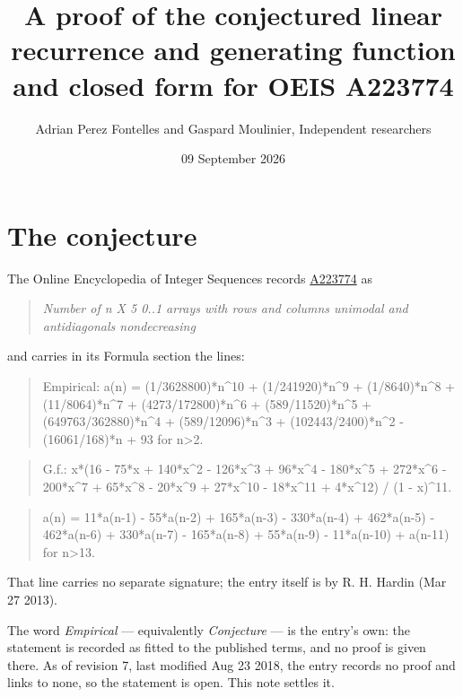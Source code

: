 \documentclass[11pt]{article}
\title{A proof of the conjectured linear recurrence and generating function and closed form for OEIS A223774}
\author{Adrian Perez Fontelles and Gaspard Moulinier, Independent researchers}
\date{09 September 2026}
\theoremstyle{definition}
\begin{document}
\maketitle
\section{The conjecture}

The Online Encyclopedia of Integer Sequences records \href{https://oeis.org/A223774}{A223774} as

\begin{quote}\itshape Number of n X 5 0..1 arrays with rows and columns unimodal and antidiagonals nondecreasing\end{quote}

and carries in its Formula section the lines:

\begin{quote}\ttfamily Empirical: a(n) = (1/3628800)*n\textasciicircum{}10 + (1/241920)*n\textasciicircum{}9 + (1/8640)*n\textasciicircum{}8 + (11/8064)*n\textasciicircum{}7 + (4273/172800)*n\textasciicircum{}6 + (589/11520)*n\textasciicircum{}5 + (649763/362880)*n\textasciicircum{}4 + (589/12096)*n\textasciicircum{}3 + (102443/2400)*n\textasciicircum{}2 - (16061/168)*n + 93 for n>2.\end{quote}

\begin{quote}\ttfamily G.f.: x*(16 - 75*x + 140*x\textasciicircum{}2 - 126*x\textasciicircum{}3 + 96*x\textasciicircum{}4 - 180*x\textasciicircum{}5 + 272*x\textasciicircum{}6 - 200*x\textasciicircum{}7 + 65*x\textasciicircum{}8 - 20*x\textasciicircum{}9 + 27*x\textasciicircum{}10 - 18*x\textasciicircum{}11 + 4*x\textasciicircum{}12) / (1 - x)\textasciicircum{}11.\end{quote}

\begin{quote}\ttfamily a(n) = 11*a(n-1) - 55*a(n-2) + 165*a(n-3) - 330*a(n-4) + 462*a(n-5) - 462*a(n-6) + 330*a(n-7) - 165*a(n-8) + 55*a(n-9) - 11*a(n-10) + a(n-11) for n>13.\end{quote}

That line carries no separate signature; the entry itself is by R. H. Hardin (Mar 27 2013).

The word {\itshape Empirical} --- equivalently {\itshape Conjecture} --- is the entry's own: the statement is recorded as fitted to the published terms, and no proof is given there. As of revision 7, last modified Aug 23 2018, the entry records no proof and links to none, so the statement is open. This note settles it.
\end{document}
